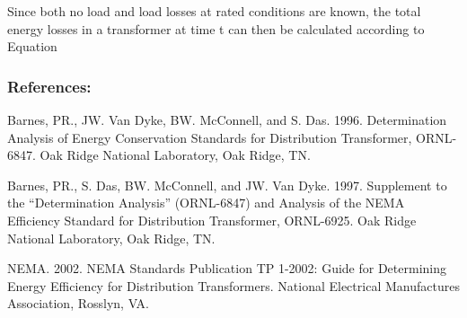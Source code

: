 Since both no load and load losses at rated conditions are known, the total energy losses in a transformer at time t can then be calculated according to Equation

\subsubsection{References:}\label{references-1-008}

Barnes, PR., JW. Van Dyke, BW. McConnell, and S. Das. 1996. Determination Analysis of Energy Conservation Standards for Distribution Transformer, ORNL-6847. Oak Ridge National Laboratory, Oak Ridge, TN.

Barnes, PR., S. Das, BW. McConnell, and JW. Van Dyke. 1997. Supplement to the ``Determination Analysis'' (ORNL-6847) and Analysis of the NEMA Efficiency Standard for Distribution Transformer, ORNL-6925. Oak Ridge National Laboratory, Oak Ridge, TN.

NEMA. 2002. NEMA Standards Publication TP 1-2002: Guide for Determining Energy Efficiency for Distribution Transformers. National Electrical Manufactures Association, Rosslyn, VA.
